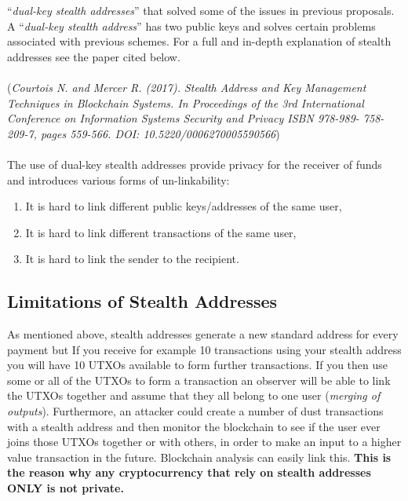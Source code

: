 “\textit{dual-key stealth addresses}” that solved some of the issues in 
previous proposals. A “\textit{dual-key stealth address}” has two public 
keys and solves certain problems associated with previous schemes. For a 
full and in-depth explanation of stealth addresses see the paper cited below.
\\
\\
\noindent
(\textit{Courtois N. and Mercer R. (2017). Stealth Address and Key Management
Techniques in Blockchain Systems. In Proceedings of the 3rd International
Conference on Information Systems Security and Privacy ISBN 978-989-
758-209-7, pages 559-566. DOI: 10.5220/0006270005590566})
\\
\\
\noindent
The use of dual-key stealth addresses provide privacy for the receiver of
funds and introduces various forms of un-linkability:

\begin{enumerate}
	\item It is hard to	link different public keys/addresses of the same user,
	\item It is hard to	link different transactions of the same user,
	\item It is hard to link the sender to the recipient.
\end{enumerate}

\subsection{Limitations of Stealth Addresses}
As mentioned above, stealth addresses generate a new standard address for
every payment but If you receive for example 10 transactions using your
stealth address you will have 10 UTXOs available to form further
transactions. If you then use some or all of the UTXOs to form a transaction
an observer will be able to link the UTXOs together and assume that they all
belong to one user (\textit{merging of outputs}). Furthermore, an attacker could
create a number of dust transactions with a stealth address and then monitor
the blockchain to see if the user ever joins those UTXOs together or with
others, in order to make an input to a higher value transaction in the future.
Blockchain analysis can easily link this. \textbf{This is the reason why any
cryptocurrency that rely on stealth addresses ONLY is not private.}
\newpage

